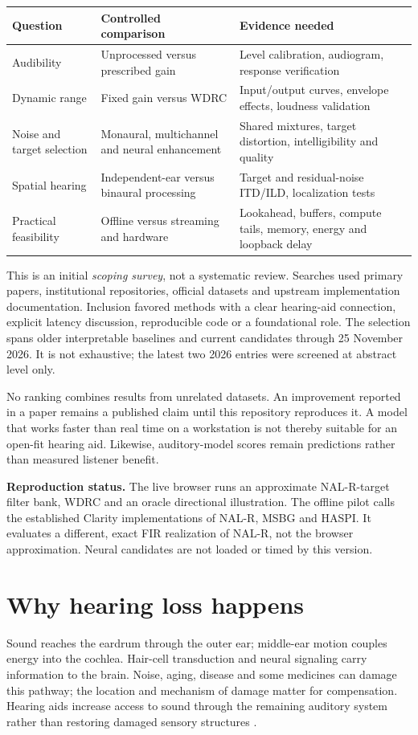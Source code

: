 \documentclass[11pt,a4paper]{article}
\begin{document}
\begin{tabularx}{\linewidth}{@{}p{.22\linewidth}YY@{}}\toprule
Question & Controlled comparison & Evidence needed\\\midrule
Audibility & Unprocessed versus prescribed gain & Level calibration, audiogram, response verification\\
Dynamic range & Fixed gain versus WDRC & Input/output curves, envelope effects, loudness validation\\
Noise and target selection & Monaural, multichannel and neural enhancement & Shared mixtures, target distortion, intelligibility and quality\\
Spatial hearing & Independent-ear versus binaural processing & Target and residual-noise ITD/ILD, localization tests\\
Practical feasibility & Offline versus streaming and hardware & Lookahead, buffers, compute tails, memory, energy and loopback delay\\\bottomrule
\end{tabularx}

This is an initial \emph{scoping survey}, not a systematic review. Searches used primary papers, institutional repositories, official datasets and upstream implementation documentation. Inclusion favored methods with a clear hearing-aid connection, explicit latency discussion, reproducible code or a foundational role. The selection spans older interpretable baselines and current candidates through 25 November 2026. It is not exhaustive; the latest two 2026 entries were screened at abstract level only.

No ranking combines results from unrelated datasets. An improvement reported in a paper remains a published claim until this repository reproduces it. A model that works faster than real time on a workstation is not thereby suitable for an open-fit hearing aid. Likewise, auditory-model scores remain predictions rather than measured listener benefit.

\textbf{Reproduction status.} The live browser runs an approximate NAL-R-target filter bank, WDRC and an oracle directional illustration. The offline pilot calls the established Clarity implementations of NAL-R, MSBG and HASPI. It evaluates a different, exact FIR realization of NAL-R, not the browser approximation. Neural candidates are not loaded or timed by this version.
\section{Why hearing loss happens}
Sound reaches the eardrum through the outer ear; middle-ear motion couples energy into the cochlea. Hair-cell transduction and neural signaling carry information to the brain. Noise, aging, disease and some medicines can damage this pathway; the location and mechanism of damage matter for compensation. Hearing aids increase access to sound through the remaining auditory system rather than restoring damaged sensory structures \cite{nidcd}.
\end{document}
